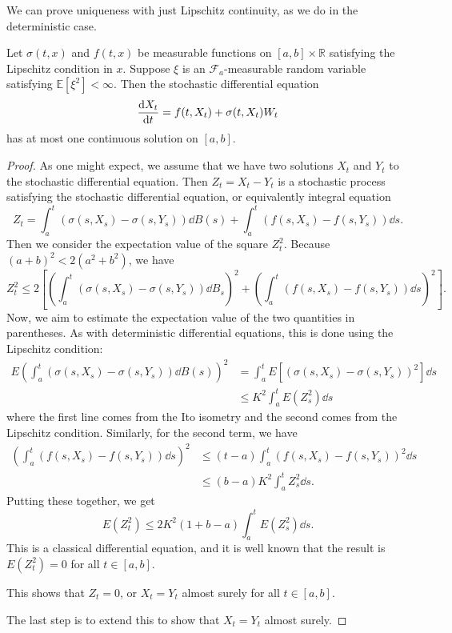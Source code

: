 \documentclass[prb,12pt]{revtex4-2}
\theoremstyle{definition}
\theoremstyle{definition}
\theoremstyle{definition}
\newcommand{\R}{\mathbb{R}}
\begin{document}
We can prove uniqueness with just Lipschitz continuity, as we do in the deterministic case.
\begin{Theorem}
	Let $\sigma(t,x)$ and $f(t,x)$ be measurable functions on $[a,b]\times \R$ satisfying the Lipschitz condition in $x$. Suppose $\xi$ is an $\mathcal{F}_a$-measurable random variable satisfying $\mathbb{E}[\xi^2]<\infty$. Then the stochastic differential equation
	\[\dv{X_t}{t}=f(t, X_t)+\sigma(t, X_t)W_t\]
	has at most one continuous solution on $[a,b]$.
\end{Theorem}
\begin{proof}
	As one might expect, we assume that we have two solutions $X_t$ and $Y_t$ to the stochastic differential equation. Then $Z_t=X_t-Y_t$ is a stochastic process satisfying the stochastic differential equation, or equivalently integral equation
	\[Z_t = \int_a^t (\sigma(s, X_s) - \sigma (s, Y_s))\dd{B(s)}+\int_a^t (f(s, X_s) - f(s, Y_s))\dd{s}.\]
	Then we consider the expectation value of the square $Z_t^2$. Because $(a+b)^2 < 2(a^2+b^2)$, we have
	\[Z_t^2 \le 2\left[\left(\int_a^t (\sigma(s, X_s) - \sigma(s, Y_s))\dd{B_s}\right)^2 + \left(\int_a^t (f(s, X_s) - f(s, Y_s))\dd{s}\right)^2\right].\]
	Now, we aim to estimate the expectation value of the two quantities in parentheses. As with deterministic differential equations, this is done using the Lipschitz condition:
	\begin{align*}
		E\left(\int_a^t (\sigma(s, X_s) - \sigma(s, Y_s))\dd{B(s)}\right)^2&= \int_a^t E[(\sigma(s, X_s)-\sigma(s, Y_s))^2]\dd{s}\\
		&\le K^2 \int_a^t E(Z_s^2)\dd{s}
	\end{align*} 
where the first line comes from the Ito isometry and the second comes from the Lipschitz condition. Similarly, for the second term, we have
\begin{align*}
	\left(\int_a^t (f(s, X_s) - f(s, Y_s))\dd{s}\right)^2 &\le (t-a)\int_a^t (f(s, X_s) - f(s, Y_s))^2 \dd{s}\\
	&\le (b-a)K^2 \int_a^t Z_s^2\dd{s}.
\end{align*}
Putting these together, we get
\[E(Z_t^2)\le 2K^2(1+b-a)\int_a^t E(Z_s^2)\dd{s}.\]
This is a classical differential equation, and it is well known that the result is $E(Z_t^2)=0$ for all $t\in [a,b]$.

This shows that $Z_t=0$, or $X_t=Y_t$ almost surely for all $t\in [a,b]$. 

The last step is to extend this to show that $X_t=Y_t$ almost surely.


\end{proof}
\end{document}
